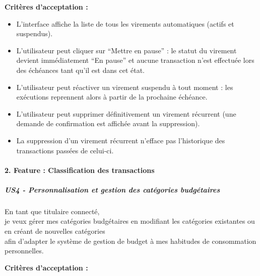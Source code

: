 \textbf{Critères d'acceptation :}

\begin{itemize}
\tightlist
\item
  L'interface affiche la liste de tous les virements automatiques
  (actifs et suspendus).
\item
  L'utilisateur peut cliquer sur ``Mettre en pause'' : le statut du
  virement devient immédiatement ``En pause'' et aucune transaction
  n'est effectuée lors des échéances tant qu'il est dans cet état.
\item
  L'utilisateur peut réactiver un virement suspendu à tout moment : les
  exécutions reprennent alors à partir de la prochaine échéance.
\item
  L'utilisateur peut supprimer définitivement un virement récurrent (une
  demande de confirmation est affichée avant la suppression).
\item
  La suppression d'un virement récurrent n'efface pas l'historique des
  transactions passées de celui-ci.
\end{itemize}

\hypertarget{feature-classification-des-transactions}{%
\paragraph{2. Feature : Classification des
transactions}\label{feature-classification-des-transactions}}

\hypertarget{us4---personnalisation-et-gestion-des-catuxe9gories-budguxe9taires}{%
\subparagraph{US4 - Personnalisation et gestion des catégories
budgétaires}\label{us4---personnalisation-et-gestion-des-catuxe9gories-budguxe9taires}}

En tant que titulaire connecté,\\
je veux gérer mes catégories budgétaires en modifiant les catégories
existantes ou en créant de nouvelles catégories\\
afin d'adapter le système de gestion de budget à mes habitudes de
consommation personnelles.

\textbf{Critères d'acceptation :}

